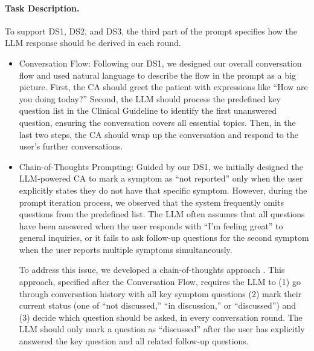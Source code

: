 \paragraph{Task Description.}
To support DS1, DS2, and DS3, the third part of the prompt specifies how the LLM response should be derived in each round.
\begin{itemize}

\item Conversation Flow:
Following our DS1, we designed our overall conversation flow and used natural language to describe the flow in the prompt as a big picture. First, the CA should greet the patient with expressions like ``How are you doing today?'' Second, the LLM should process the predefined key question list in the Clinical Guideline to identify the first unanswered question, ensuring the conversation covers all essential topics.
Then, in the last two steps, the CA should wrap up the conversation and respond to the user's further conversations.

\item Chain-of-Thoughts Prompting:
Guided by our DS1, we initially designed the LLM-powered CA to mark a symptom as ``not reported'' only when the user explicitly states they do not have that specific symptom. 
However, during the prompt iteration process, we observed that the system frequently omits questions from the predefined list. 
The LLM often assumes that all questions have been answered when the user responds with ``I'm feeling great'' to general inquiries, or it fails to ask follow-up questions for the second symptom when the user reports multiple symptoms simultaneously.

To address this issue, we developed a chain-of-thoughts approach \cite{wei2022chain}. This approach, specified after the Conversation Flow, requires the LLM to (1) go through conversation history with all key symptom questions (2) mark their current status (one of ``not discussed,'' ``in discussion,'' or ``discussed'') and (3) decide which question should be asked, in every conversation round. 
The LLM should only mark a question as ``discussed'' after the user has explicitly answered the key question and all related follow-up questions.


\end{itemize}
